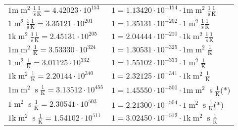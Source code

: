 \begin{center}
\begin{longtable}{l l}
{\color{gray}$1 \bm{\mathrm{ m}}{\operatorname{m}^2}\frac1{\operatorname{s}}{}\frac1{\operatorname{K}} = 4.42023\cdot10^{153} $}   & {\color{gray}$ 1 = 1.13420\cdot10^{-154} \cdot 1 \bm{\mathrm{ m}}{\operatorname{m}^2}\frac1{\operatorname{s}}{}\frac1{\operatorname{K}}$}  \\
{\color{black}$1 \bm{\mathrm{ }}{\operatorname{m}^2}\frac1{\operatorname{s}}{}\frac1{\operatorname{K}} = 3.35121\cdot10^{201} $}   & {\color{black}$ 1 = 1.35131\cdot10^{-202} \cdot 1 \bm{\mathrm{ }}{\operatorname{m}^2}\frac1{\operatorname{s}}{}\frac1{\operatorname{K}}$}  \\
{\color{gray}$1 \bm{\mathrm{ k}}{\operatorname{m}^2}\frac1{\operatorname{s}}{}\frac1{\operatorname{K}} = 2.45131\cdot10^{205} $}   & {\color{gray}$ 1 = 2.04444\cdot10^{-210} \cdot 1 \bm{\mathrm{ k}}{\operatorname{m}^2}\frac1{\operatorname{s}}{}\frac1{\operatorname{K}}$}  \\
{\color{gray}$1 \bm{\mathrm{ m}}{\operatorname{m}^2}{}{}\frac1{\operatorname{K}} = 3.53330\cdot10^{324} $}   & {\color{gray}$ 1 = 1.30531\cdot10^{-325} \cdot 1 \bm{\mathrm{ m}}{\operatorname{m}^2}{}{}\frac1{\operatorname{K}}$}  \\
{\color{black}$1 \bm{\mathrm{ }}{\operatorname{m}^2}{}{}\frac1{\operatorname{K}} = 3.01125\cdot10^{332} $}   & {\color{black}$ 1 = 1.55102\cdot10^{-333} \cdot 1 \bm{\mathrm{ }}{\operatorname{m}^2}{}{}\frac1{\operatorname{K}}$}  \\
{\color{gray}$1 \bm{\mathrm{ k}}{\operatorname{m}^2}{}{}\frac1{\operatorname{K}} = 2.20144\cdot10^{340} $}   & {\color{gray}$ 1 = 2.32125\cdot10^{-341} \cdot 1 \bm{\mathrm{ k}}{\operatorname{m}^2}{}{}\frac1{\operatorname{K}}$}  \\
{\color{gray}$1 \bm{\mathrm{ m}}{\operatorname{m}^2}{\operatorname{s}}{}\frac1{\operatorname{K}} = 3.13512\cdot10^{455} $}   & {\color{gray}$ 1 = 1.45550\cdot10^{-500} \cdot 1 \bm{\mathrm{ m}}{\operatorname{m}^2}{\operatorname{s}}{}\frac1{\operatorname{K}}$}\quad(*)\\
{\color{black}$1 \bm{\mathrm{ }}{\operatorname{m}^2}{\operatorname{s}}{}\frac1{\operatorname{K}} = 2.30541\cdot10^{503} $}   & {\color{black}$ 1 = 2.21300\cdot10^{-504} \cdot 1 \bm{\mathrm{ }}{\operatorname{m}^2}{\operatorname{s}}{}\frac1{\operatorname{K}}$}\quad(*)\\
{\color{gray}$1 \bm{\mathrm{ k}}{\operatorname{m}^2}{\operatorname{s}}{}\frac1{\operatorname{K}} = 1.54102\cdot10^{511} $}   & {\color{gray}$ 1 = 3.02450\cdot10^{-512} \cdot 1 \bm{\mathrm{ k}}{\operatorname{m}^2}{\operatorname{s}}{}\frac1{\operatorname{K}}$}  \\

\end{longtable}
\end{center}
